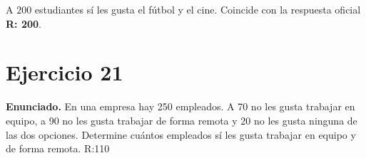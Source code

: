 \documentclass[11pt]{article}
\begin{document}
\begin{resp}
A $\boxed{200}$ estudiantes s\'i les gusta el f\'utbol y el cine. Coincide con la respuesta oficial \textbf{R: 200}.
\end{resp}

\newpage

\section*{Ejercicio 21}

\textbf{Enunciado.} En una empresa hay 250 empleados. A 70 no les gusta trabajar en equipo, a 90 no les gusta trabajar de forma remota y 20 no les gusta ninguna de las dos opciones. Determine cu\'antos empleados s\'i les gusta trabajar en equipo y de forma remota. R:110
\end{document}
